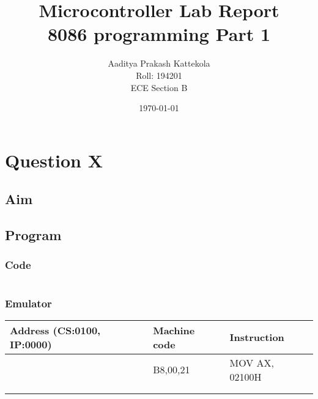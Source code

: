 \documentclass{article}
\title{
	Microcontroller Lab Report \\
\large 8086 programming Part 1
} %
\author{
	Aaditya Prakash Kattekola \\
	{\small Roll: 194201} \\
	{\small ECE Section B} \\
} %
\date{\today} %
\begin{document}
\maketitle %




\break
\section{Question X}

\subsection{Aim}



\subsection{Program}
\subsubsection{Code}
\inputminted{nasm}{"C:/Users/aadit/Documents/BTech/5th Semester/MC Lab/Sample Lab Report/First.asm"}

\subsubsection{Emulator}

\begin{center}
\begin{tabularx}{1.0\textwidth} { 
  | >{\centering\arraybackslash}X 
  | >{\centering\arraybackslash}X 
  | >{\centering\arraybackslash}X | }
 \hline
\textbf{Address  (CS:0100, IP:0000)} &\textbf{Machine code}&\textbf{Instruction} \\
  \hline
 01000 & B8,00,21 & MOV AX, 02100H \\ 
  \hline
  & &  \\ 
  \hline
  & &  \\ 
  \hline
\end{tabularx}
\end{center}
\end{document}
